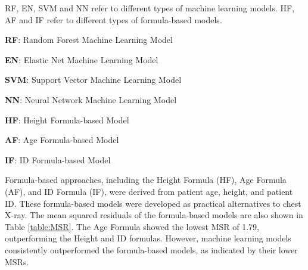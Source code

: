 \documentclass[11pt]{article}
\begin{document}
\begin{table}[h]
\caption{Mean squared residuals of Machine Learning models, and Formula-based models in predicting Optimal Tracheal Tube Depth}
\label{table:MSR}
\begin{threeparttable}
\renewcommand{\TPTminimum}{\linewidth}
\begin{tablenotes}
\footnotesize
\item RF, EN, SVM and NN refer to different types of machine learning models. HF, AF and IF refer to different types of formula-based models.
\item \textbf{RF}: Random Forest Machine Learning Model
\item \textbf{EN}: Elastic Net Machine Learning Model
\item \textbf{SVM}: Support Vector Machine Learning Model
\item \textbf{NN}: Neural Network Machine Learning Model
\item \textbf{HF}: Height Formula-based Model
\item \textbf{AF}: Age Formula-based Model
\item \textbf{IF}: ID Formula-based Model
\end{tablenotes}
\end{threeparttable}
\end{table}


Formula-based approaches, including the Height Formula (HF), Age Formula (AF), and ID Formula (IF), were derived from patient age, height, and patient ID. These formula-based models were developed as practical alternatives to chest X-ray. The mean squared residuals of the formula-based models are also shown in Table \ref{table:MSR}. The Age Formula showed the lowest MSR of 1.79, outperforming the Height and ID formulas. However, machine learning models consistently outperformed the formula-based models, as indicated by their lower MSRs.
\end{document}
